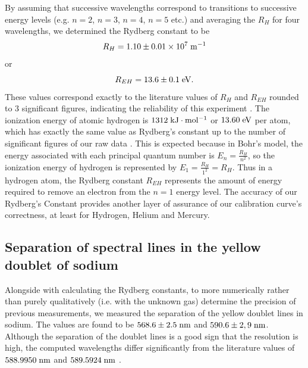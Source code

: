 \documentclass[12pt]{article}
\begin{document}
By assuming that successive wavelengths correspond to transitions to successive energy levels (e.g. $n=2$, $n=3$, $n=4$, $n=5$ etc.) and averaging the $R_H$ for four wavelengths, we determined the Rydberg constant to be
\begin{equation}
    R_H = 1.10 \pm0.01\times 10^7 \;{\rm m^{-1}}
    \label{eq: R_H}
\end{equation}
or
\begin{equation}
    R_{EH}=13.6\pm0.1\;{\rm eV}.
    \label{eq: R_{EH}}
\end{equation}
These values correspond exactly to the literature values of $R_H$ and $R_{EH}$ rounded to 3 significant figures, indicating the reliability of this experiment \autocite{PhysRevA.34.5138}.
The ionization energy of atomic hydrogen is $1312\;{\rm kJ\cdot mol^{-1}}$ or $13.60\;{\rm eV}$ per atom, which has exactly the same value as Rydberg's constant up to the number of significant figures of our raw data \autocite{PhysRevA.34.5138}. This is expected because in Bohr's model, the energy associated with each principal quantum number is $E_n = \frac{R_H}{n^2}$, so the ionization energy of hydrogen is represented by $E_1 = \frac{R_H}{1^2}=R_H$. Thus in a hydrogen atom, the Rydberg constant $R_{EH}$ represents the amount of energy required to remove an electron from the $n=1$ energy level. The accuracy of our Rydberg's Constant provides another layer of assurance of our calibration curve's correctness, at least for Hydrogen, Helium and Mercury.

\subsection{Separation of spectral lines in the yellow doublet of sodium}
Alongside with calculating the Rydberg constants, to more numerically rather than purely qualitatively (i.e. with the unknown gas) determine the precision of previous measurements, we measured the separation of the yellow doublet lines in sodium. The values are found to be $568.6\pm2.5\;{\rm nm}$ and $590.6\pm2,9\;{\rm nm}$. Although the separation of the doublet lines is a good sign that the resolution is high, the computed wavelengths differ significantly from the literature values of $588.9950\;{\rm nm}$ and $589.5924\;{\rm nm}$ \autocite{manuall}. 
\end{document}
